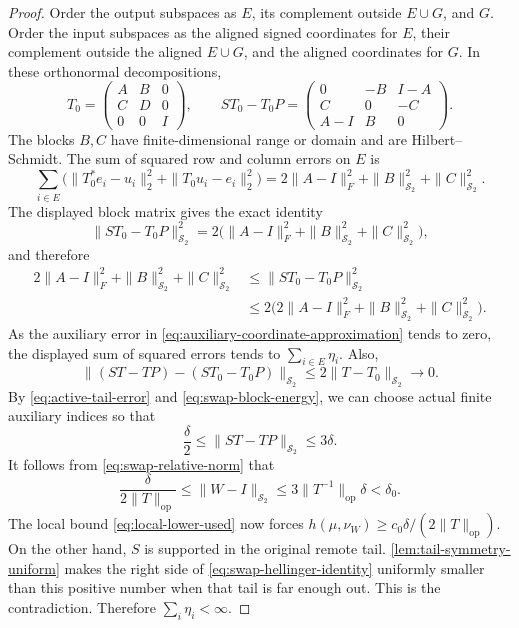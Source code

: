 \begin{proof}
Order the output subspaces as $E$, its complement outside $E\cup G$, and $G$.
Order the input subspaces as the aligned signed coordinates for $E$, their
complement outside the aligned $E\cup G$, and the aligned coordinates for
$G$.
In these orthonormal decompositions,
\[
 T_0=\begin{pmatrix}A&B&0\\ C&D&0\\0&0&I\end{pmatrix},
 \qquad
 ST_0-T_0P=
 \begin{pmatrix}
 0&-B&I-A\\
 C&0&-C\\
 A-I&B&0
 \end{pmatrix}.
\]
The blocks $B,C$ have finite-dimensional range or domain and are
Hilbert--Schmidt.  The sum of squared row and column errors on $E$ is
\[
 \sum_{i\in E}
 \bigl(\|T_0^*e_i-u_i\|_2^2+\|T_0u_i-e_i\|_2^2\bigr)
 =2\|A-I\|_F^2+\|B\|_{\mathcal S_2}^2+\|C\|_{\mathcal S_2}^2.
\]
The displayed block matrix gives the exact identity
\[
 \|ST_0-T_0P\|_{\mathcal S_2}^2
 =2\bigl(\|A-I\|_F^2+\|B\|_{\mathcal S_2}^2
                         +\|C\|_{\mathcal S_2}^2\bigr),
\]
and therefore
\begin{equation}
 \begin{aligned}
 2\|A-I\|_F^2+\|B\|_{\mathcal S_2}^2+\|C\|_{\mathcal S_2}^2
 &\leq\|ST_0-T_0P\|_{\mathcal S_2}^2\\
 &\leq2\bigl(2\|A-I\|_F^2+\|B\|_{\mathcal S_2}^2
                              +\|C\|_{\mathcal S_2}^2\bigr).
 \end{aligned}
 \label{eq:swap-block-energy}
\end{equation}
As the auxiliary error in
\eqref{eq:auxiliary-coordinate-approximation} tends to zero,
the displayed sum of squared errors tends to $\sum_{i\in E}\eta_i$.
Also,
\[
 \|(ST-TP)-(ST_0-T_0P)\|_{\mathcal S_2}
 \leq2\|T-T_0\|_{\mathcal S_2}\longrightarrow0.
\]
By \eqref{eq:active-tail-error} and
\eqref{eq:swap-block-energy}, we can choose actual finite auxiliary indices
so that
\[
 \frac{\delta}{2}\leq\|ST-TP\|_{\mathcal S_2}\leq3\delta.
\]
It follows from \eqref{eq:swap-relative-norm} that
\[
 \frac{\delta}{2\|T\|_{\mathrm{op}}}
 \leq\|W-I\|_{\mathcal S_2}
 \leq3\|T^{-1}\|_{\mathrm{op}}\delta<\delta_0.
\]
The local bound \eqref{eq:local-lower-used} now forces
$h(\mu,\nu_W)\geq c_0\delta/(2\|T\|_{\mathrm{op}})$.
On the other hand, $S$ is supported in the original remote tail.
\cref{lem:tail-symmetry-uniform} makes the right side of
\eqref{eq:swap-hellinger-identity} uniformly smaller than this positive
number when that tail is far enough out.
This is the contradiction.
Therefore $\sum_i\eta_i<\infty$.


\end{proof}
